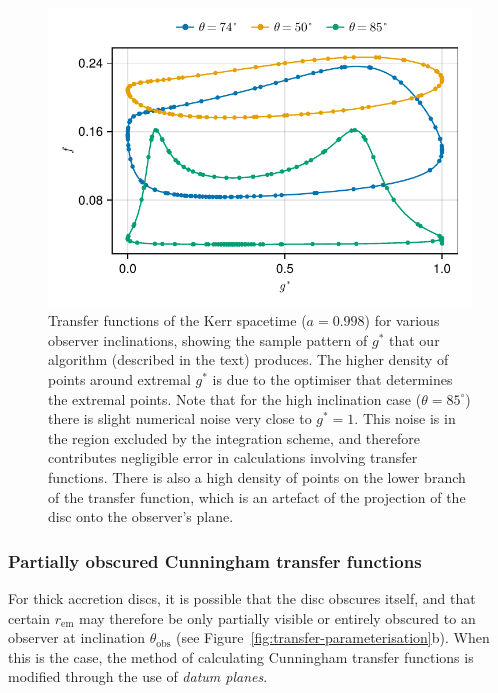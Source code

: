 \documentclass[fleqn,usenatbib]{mnras}
\newcommand{\rhoem}{r_\text{em}}
\begin{document}
\begin{figure}
    \centering
    \includegraphics[width=0.95\columnwidth]{figures/transfer-functions.sampling.pdf}
    \caption{Transfer functions of the Kerr spacetime ($a = 0.998$) for various
        observer inclinations, showing the sample pattern of $g^\ast$ that our
        algorithm (described in the text) produces. The higher density of points
        around extremal $g^\ast$ is due to the optimiser
        that determines the extremal points. Note that for the high inclination
        case ($\theta = 85^\circ$) there is slight numerical noise very close to
        $g^\ast = 1$. This noise is in the region excluded by the integration
        scheme, and therefore contributes negligible error in calculations
        involving transfer functions. There is also a high density of points on
        the lower branch of the transfer function, which is an artefact of the
        projection of the disc onto the observer's plane.
    }
    \label{fig:transfer-sampling-pattern}
\end{figure}

\subsubsection{Partially obscured Cunningham transfer functions}
\label{sec:partially-obscured-functions}

For thick accretion discs, it is possible that the disc obscures itself, and
that certain $\rhoem$ may therefore be only partially visible or entirely
obscured to an observer at inclination $\theta_\text{obs}$ (see
Figure~\ref{fig:transfer-parameterisation}b). When this is the case, the method
of calculating Cunningham transfer functions is modified through the use of
\emph{datum planes}.
\end{document}
